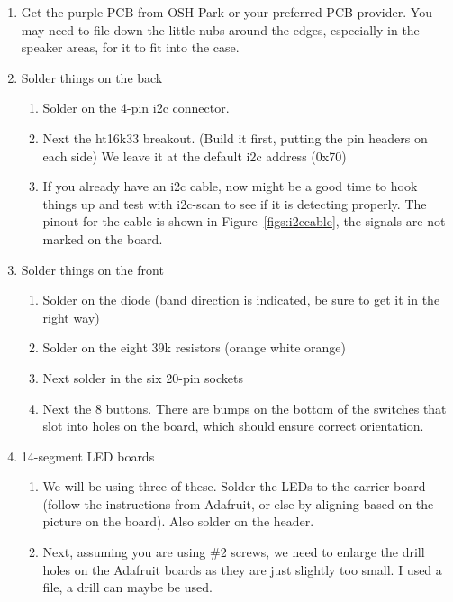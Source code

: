 \documentclass[11pt]{article}
\begin{document}
\begin{enumerate}
\item	Get the purple PCB from OSH Park or your preferred PCB provider.
	You may need to file down the little nubs around the edges, 
	especially in the speaker areas, for it to fit into the case.

\item Solder things on the back
	\begin{enumerate}
		\item	Solder on the 4-pin i2c connector.
		\item	Next the ht16k33 breakout.
			(Build it first, putting the pin headers on each side)
			We leave it at the default i2c address (0x70)
		\item	If you already have an i2c cable, now might be a good
			time to hook  things up and test with i2c-scan to see 
			if it is detecting properly.
			The pinout for the cable is shown in
			Figure~\ref{figs:i2ccable}, the signals are not 
			marked on the board.
	\end{enumerate}

\item Solder things on the front
	\begin{enumerate}
	\item	Solder on the diode 
		(band direction is indicated, be sure to get it in
		the right way)
	\item	Solder on the eight 39k resistors (orange white orange)
	\item	Next solder in the six 20-pin sockets
	\item	Next the 8 buttons.
		There are bumps on the bottom of the
		switches that slot into holes on the board, which should
		ensure correct orientation.
	\end{enumerate}

\item 14-segment LED boards

	\begin{enumerate}

		\item	We will be using three of these.
			Solder the LEDs to the carrier board (follow
			the instructions from Adafruit, or else by
			aligning based on the picture on the board).
			Also solder on the header.

		\item  Next, assuming you are using \#2 screws,
			we need to enlarge the
			drill holes on the Adafruit boards as they are
			just slightly too small.
			I used a file, a drill can maybe be used.


\end{enumerate}
\end{enumerate}
\end{document}
